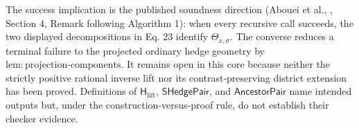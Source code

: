 The success implication is the published soundness direction (Abouei et al., \cite{AboueiEtAl2024LatentSID}, Section 4, Remark following Algorithm 1): when every recursive call succeeds, the two displayed decompositions in Eq. 23 identify \(\Theta_{x,\sigma}\).  The converse reduces a terminal failure to the projected ordinary hedge geometry by \(\mathrm{lem:projection\text{-}components}\).  It remains open in this core because neither the strictly positive rational inverse lift nor its contrast-preserving district extension has been proved.  Definitions of \(\mathsf H_{\mathrm{lift}}\), \(\mathsf{SHedgePair}\), and \(\mathsf{AncestorPair}\) name intended outputs but, under the construction-versus-proof rule, do not establish their checker evidence.